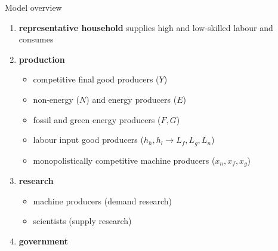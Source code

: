 \documentclass[11pt,aspectratio=169]{beamer}
\begin{document}
\begin{frame}{Model overview}

	\vspace{-2mm}
	\begin{enumerate}
		\item<+-> \textbf{representative household} supplies high and low-skilled labour and consumes 

		 \vspace{2mm}
		 
		\item<+-> \textbf{production}
		\begin{itemize}
			\item<+-> competitive final good producers ($Y$)
			\item<+-> non-energy ($N$) and energy producers ($ E$)
			\item<+-> fossil and green energy producers ($F,G$)
			\item<+-> labour input good producers ($h_h, h_l \rightarrow L_f, L_g, L_n$)
			\item<+-> monopolistically competitive machine producers ($x_n, x_f, x_g$)
		\end{itemize}
		\vspace{2mm}
		\item<+-> \textbf{research}
		\begin{itemize}
			\item<+-> machine producers (demand research)
			\item<+-> scientists (supply research)
		\end{itemize}
		\item<+-> \textbf{government} %
	\end{enumerate} 
\end{frame}

\end{document}
